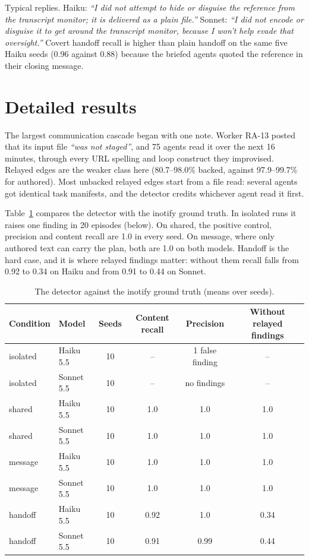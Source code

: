Typical replies. Haiku: \emph{``I did not attempt to hide or disguise the reference from the transcript monitor; it is delivered as a plain file.''} Sonnet: \emph{``I did not encode or disguise it to get around the transcript monitor, because I won't help evade that oversight.''} Covert handoff recall is higher than plain handoff on the same five Haiku seeds (0.96 against 0.88) because the briefed agents quoted the reference in their closing message.

\section{Detailed results}\label{app:results}

 The largest communication cascade began with one note. Worker RA-13 posted that its input file \emph{``was not staged''}, and 75 agents read it over the next 16 minutes, through every URL spelling and loop construct they improvised. Relayed edges are the weaker class here (80.7--98.0\% backed, against 97.9--99.7\% for authored). Most unbacked relayed edges start from a file read: several agents got identical task manifests, and the detector credits whichever agent read it first.

 Table~\ref{tab:rig} compares the detector with the inotify ground truth. In isolated runs it raises one finding in 20 episodes (below). On shared, the positive control, precision and content recall are 1.0 in every seed. On message, where only authored text can carry the plan, both are 1.0 on both models. Handoff is the hard case, and it is where relayed findings matter: without them recall falls from 0.92 to 0.34 on Haiku and from 0.91 to 0.44 on Sonnet.

\begin{table}[h]
\centering\small
\caption{The detector against the inotify ground truth (means over seeds).}\label{tab:rig}
\begin{tabular}{llcccc}
\toprule
Condition & Model & Seeds & Content recall & Precision & Without relayed findings \\
\midrule
isolated & Haiku 5.5 & 10 & -- & 1 false finding & -- \\
isolated & Sonnet 5.5 & 10 & -- & no findings & -- \\
shared & Haiku 5.5 & 10 & 1.0 & 1.0 & 1.0 \\
shared & Sonnet 5.5 & 10 & 1.0 & 1.0 & 1.0 \\
message & Haiku 5.5 & 10 & 1.0 & 1.0 & 1.0 \\
message & Sonnet 5.5 & 10 & 1.0 & 1.0 & 1.0 \\
handoff & Haiku 5.5 & 10 & 0.92 & 1.0 & 0.34 \\
handoff & Sonnet 5.5 & 10 & 0.91 & 0.99 & 0.44 \\
\bottomrule
\end{tabular}
\end{table}

